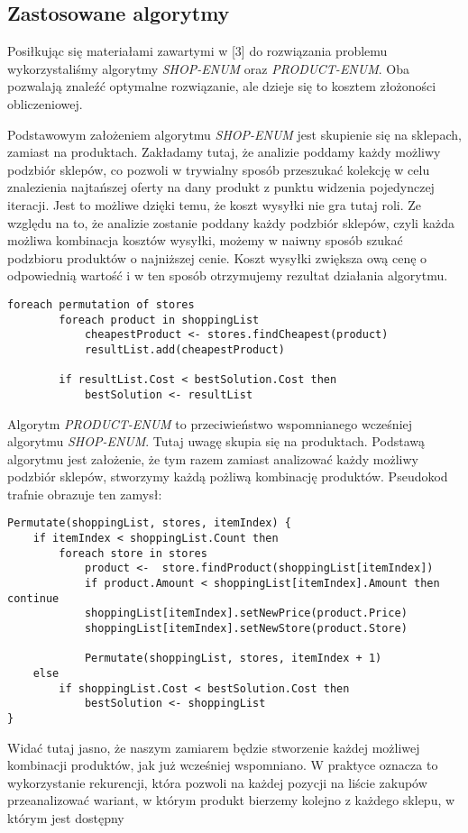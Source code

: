\documentclass[a4paper]{article}
\begin{document}
\subsection{Zastosowane algorytmy}
Posiłkując się materiałami zawartymi w [3] do rozwiązania problemu wykorzystaliśmy algorytmy \textit{SHOP-ENUM} oraz \textit{PRODUCT-ENUM}. Oba pozwalają znaleźć optymalne rozwiązanie, ale dzieje się to kosztem złożoności obliczeniowej.

Podstawowym założeniem algorytmu \textit{SHOP-ENUM} jest skupienie się na sklepach, zamiast na produktach. Zakładamy tutaj, że analizie poddamy każdy możliwy podzbiór sklepów, co pozwoli w trywialny sposób przeszukać kolekcję w celu znalezienia najtańszej oferty na dany produkt z punktu widzenia pojedynczej iteracji. Jest to możliwe dzięki temu, że koszt wysyłki nie gra tutaj roli. Ze względu na to, że analizie zostanie poddany każdy podzbiór sklepów, czyli każda możliwa kombinacja kosztów wysyłki, możemy w naiwny sposób szukać podzbioru produktów o najniższej cenie. Koszt wysyłki zwiększa ową cenę o odpowiednią wartość i w ten sposób otrzymujemy rezultat działania algorytmu.
\vspace{0.5 cm}
\lstset{style=sharpc}
\begin{lstlisting}
foreach permutation of stores
		foreach product in shoppingList
			cheapestProduct <- stores.findCheapest(product)
			resultList.add(cheapestProduct)
		
		if resultList.Cost < bestSolution.Cost then
			bestSolution <- resultList
\end{lstlisting}
\vspace{0.5 cm}

Algorytm \textit{PRODUCT-ENUM} to przeciwieństwo wspomnianego wcześniej algorytmu \textit{SHOP-ENUM}. Tutaj uwagę skupia się na produktach. Podstawą algorytmu jest założenie, że tym razem zamiast analizować każdy możliwy podzbiór sklepów, stworzymy każdą pożliwą kombinację produktów. Pseudokod trafnie obrazuje ten zamysł:

\vspace{0.5 cm}
\lstset{style=sharpc}
\begin{lstlisting}
Permutate(shoppingList, stores, itemIndex) {
	if itemIndex < shoppingList.Count then
		foreach store in stores 
			product <-  store.findProduct(shoppingList[itemIndex])
			if product.Amount < shoppingList[itemIndex].Amount then continue
			shoppingList[itemIndex].setNewPrice(product.Price)
			shoppingList[itemIndex].setNewStore(product.Store)
		
			Permutate(shoppingList, stores, itemIndex + 1)
	else
		if shoppingList.Cost < bestSolution.Cost then
			bestSolution <- shoppingList
}
\end{lstlisting}
\vspace{0.5 cm}
Widać tutaj jasno, że naszym zamiarem będzie stworzenie każdej możliwej kombinacji produktów, jak już wcześniej wspomniano. W praktyce oznacza to wykorzystanie rekurencji, która pozwoli na każdej pozycji na liście zakupów przeanalizować wariant, w którym produkt bierzemy kolejno z każdego sklepu, w którym jest dostępny
\end{document}
